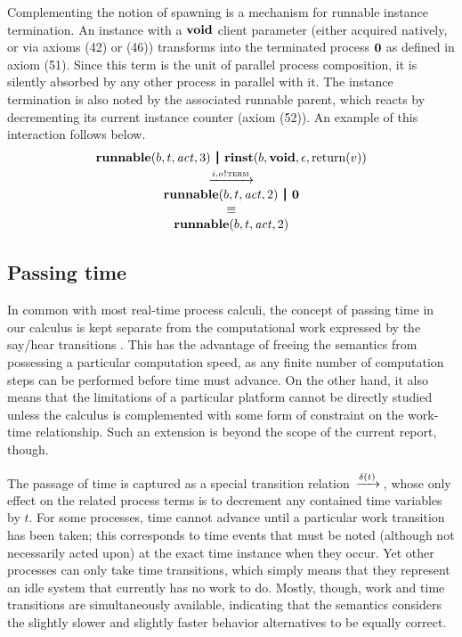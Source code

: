 \documentclass[10pt,conference]{IEEEtran}
\begin{document}
Complementing the notion of spawning is a mechanism for runnable instance termination. An instance with a $\textbf{void}$ client parameter (either acquired natively, or via axioms (42) or (46)) transforms into the terminated process $\textbf{0}$ as defined in axiom (51). Since this term is the unit of parallel process composition, it is silently absorbed by any other process in parallel with it. The instance termination is also noted by the associated runnable parent, which reacts by decrementing its current instance counter (axiom (52)). An example of this interaction follows below.
$$
\begin{array}{c}
  {\Trunnable b t \Act 3} \Opar
  {\Trinst b \Tvoid \Teps {\Treturn v}} \vspace{0.6ex} \\
  \red{\say{i.o}{\Tterm}} \\
  {\Trunnable b t \Act 2} \Opar \Tzero \\
  \equiv \\
  {\Trunnable b t \Act 2}
\end{array}
$$


\subsection{Passing time}

In common with most real-time process calculi, the concept of passing time in our calculus is kept separate from the computational work expressed by the say/hear transitions \cite{Baeten00processalgebra}. This has the advantage of freeing the semantics from possessing a particular computation speed, as any finite number of computation steps can be performed before time must advance. On the other hand, it also means that the  limitations of a particular platform cannot be directly studied unless the calculus is complemented with some form of constraint on the work-time relationship. Such an extension is beyond the scope of the current report, though.

The passage of time is captured as a special transition relation $\,\xrightarrow{\delta(t)}\,$, whose only effect on the related process terms is to decrement any contained time variables by $t$. For some processes, time cannot advance until a particular work transition has been taken; this corresponds to time events that must be noted (although not necessarily acted upon) at the exact time instance when they occur. Yet other processes can only take time transitions, which simply means that they represent an idle system that currently has no work to do. Mostly, though, work and time transitions are simultaneously available, indicating that the semantics considers the slightly slower and slightly faster behavior alternatives to be equally correct.
\end{document}
